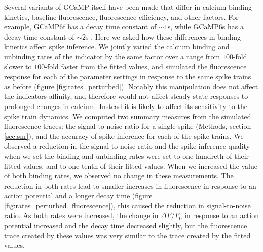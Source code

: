 Several variants of GCaMP itself have been made that differ in calcium binding kinetics, baseline fluorescence, fluorescence efficiency, and other factors. For example, GCaMP6f has a decay time constant of $\sim 1$s, while GCaMP6s has a decay time constant of $\sim 2$s  \parencite{chen}. Here we asked how these differences in binding kinetics affect spike inference. We jointly varied the calcium binding and unbinding rates of the indicator by the same factor over a range from $100$-fold slower to $100$-fold faster from the fitted values, and simulated the fluorescence response for each of the parameter settings in response to the same spike trains as before (figure \ref{fig:rates_perturbed}). Notably this manipulation does not affect the indicators affinity, and therefore would not affect steady-state responses to prolonged changes in calcium. Instead it is likely to affect its sensitivity to the spike train dynamics. We computed two summary measures from the simulated fluorescence traces: the signal-to-noise ratio for a single spike (Methods, section \ref{sec:snr}), and the accuracy of spike inference for each of the spike trains. We observed a reduction in the signal-to-noise ratio and the spike inference quality when we set the binding and unbinding rates were set to one hundreth of their fitted values, and to one tenth of their fitted values. When we increased the value of both binding rates, we observed no change in these measurements. The reduction in both rates lead to smaller increases in fluorescence in response to an action potential and a longer decay time (figure \ref{fig:rates_perturbed_fluorescence}), this caused the reduction in signal-to-noise ratio. As both rates were increased, the change in $\Delta F/F_0$ in response to an action potential increased and the decay time decreased slightly, but the fluorescence trace created by these values was very similar to the trace created by the fitted values.


